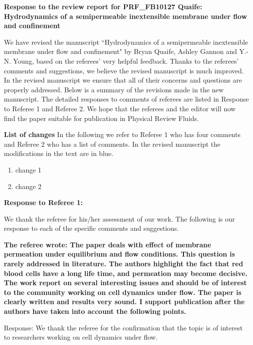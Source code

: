 \documentclass[12pt]{article}
\begin{document}
{\large \bf Response to the review report for PRF\_FB10127 Quaife: Hydrodynamics of a semipermeable inextensible membrane under flow and confinement}
\vspace{0.5cm}

We have revised the manuscript ``Hydrodynamics of a semipermeable inextensible membrane under flow and confinement"  
by Bryan Quaife, Ashley Gannon and Y.-N. Young, 
based on 
the referees' very helpful feedback.  
Thanks to the referees' comments
and suggestions, we believe the revised manuscript is much
improved. 
In the revised manuscript we ensure that
all of their concerns and questions are properly addressed.
Below is a summary of the revisions made in the new manuscript.
The detailed responses to comments of referees are listed in 
Response to Referee 1 and Referee 2.
We hope that the referees and the
editor will now find the paper suitable for publication in 
Physical Review Fluids.

\vspace{0.5cm}
{\large \bf List of changes}
In the following we refer to 
Referee 1 who has four comments and Referee 2 who has a list of comments. In the revised manuscript the modifications in the text are in blue.

\begin{enumerate}
\item{change 1}
\item{change 2}
\end{enumerate}

\newpage
\vspace{0.5cm}
{\large \bf Response to Referee 1:}
\vspace{0.5cm}

We thank the referee for his/her assessment of our work.  
The following is
our response to each of the specific comments and suggestions.


{\bf The referee wrote:
The paper deals with effect of membrane permeation under equilibrium
and flow conditions. This question is rarely addressed in literature.
The authors highlight the fact that red blood cells have a long life
time, and permeation may become decisive. The work report on several
interesting issues and should be of interest to the community working
on cell dynamics under flow. The paper is clearly written and results
very sound. I support publication after the authors have taken into
account the following points.
}

\noindent
Response: We thank the referee for the confirmation that the topic is of interest to researchers working on cell dynamics under flow.
\end{document}
